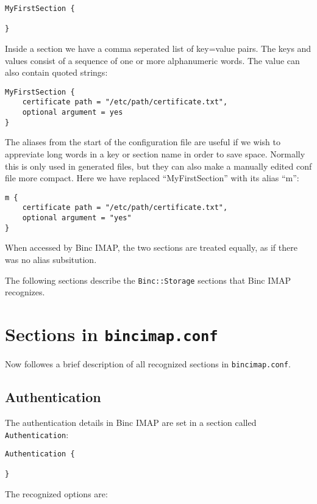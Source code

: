 \documentclass[11pt,a4paper,twoside,openright]{report}
\begin{document}
\begin{Verbatim}
MyFirstSection {

}
\end{Verbatim}
Inside a section we have a comma seperated list of key=value pairs.
The keys and values consist of a sequence of one or more alphanumeric
words. The value can also contain quoted strings:

\begin{Verbatim}
MyFirstSection {
    certificate path = "/etc/path/certificate.txt",
    optional argument = yes
}
\end{Verbatim}
The aliases from the start of the configuration file are useful if we
wish to appreviate long words in a key or section name in order to
save space. Normally this is only used in generated files, but they
can also make a manually edited conf file more compact. Here we have
replaced ``MyFirstSection'' with its alias ``m'':

\begin{Verbatim}
m {
    certificate path = "/etc/path/certificate.txt",
    optional argument = "yes"
}
\end{Verbatim}
When accessed by Binc IMAP, the two sections are treated equally, as
if there was no alias subsitution.

The following sections describe the \texttt{Binc::Storage} sections
that Binc IMAP recognizes.

\section{Sections in \texttt{bincimap.conf}}

Now followes a brief description of all recognized sections in
\texttt{bincimap.conf}.

\subsection{Authentication}

The authentication details in Binc IMAP are set in a section called \texttt{Authentication}:

\begin{Verbatim}
Authentication {

}
\end{Verbatim}
The recognized options are:
\end{document}
